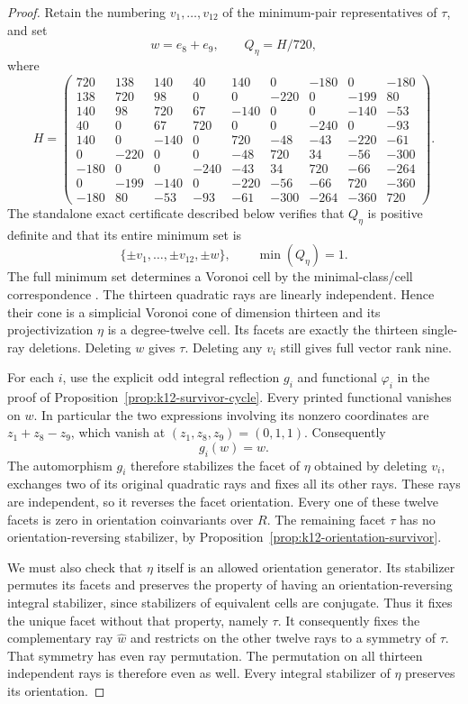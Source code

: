 \documentclass[11pt,a4paper]{article}
\theoremstyle{definition}
\begin{document}
\begin{proof}
Retain the numbering $v_1,\ldots,v_{12}$ of the minimum-pair
representatives of $\tau$, and set
\[
 w=e_8+e_9,\qquad Q_\eta=H/720,
\]
where
\begingroup
\setlength{\arraycolsep}{2.3pt}
\[
H=\begin{pmatrix}
720&138&140&40&140&0&-180&0&-180\\
138&720&98&0&0&-220&0&-199&80\\
140&98&720&67&-140&0&0&-140&-53\\
40&0&67&720&0&0&-240&0&-93\\
140&0&-140&0&720&-48&-43&-220&-61\\
0&-220&0&0&-48&720&34&-56&-300\\
-180&0&0&-240&-43&34&720&-66&-264\\
0&-199&-140&0&-220&-56&-66&720&-360\\
-180&80&-53&-93&-61&-300&-264&-360&720
\end{pmatrix}.
\]
\endgroup
The standalone exact certificate described below verifies that
$Q_\eta$ is positive definite and that its entire minimum set is
\[
              \{\pm v_1,\ldots,\pm v_{12},\pm w\},
              \qquad \min(Q_\eta)=1.                     \tag{CB.2}
\]
The full minimum set determines a Voronoi cell by the
minimal-class/cell correspondence
\cite[\S1.2.1, p.~4; \S2.1, p.~6]{DEKM2026}.
The thirteen quadratic rays are linearly independent. Hence their
cone is a simplicial Voronoi cone of dimension thirteen and its
projectivization $\eta$ is a degree-twelve cell. Its facets are
exactly the thirteen single-ray deletions. Deleting $w$ gives
$\tau$. Deleting any $v_i$ still gives full vector rank nine.

For each $i$, use the explicit odd integral reflection $g_i$ and
functional $\varphi_i$ in the proof of
Proposition~\ref{prop:k12-survivor-cycle}. Every printed functional
vanishes on $w$. In particular the two expressions involving its
nonzero coordinates are $z_1+z_8-z_9$, which vanish at
$(z_1,z_8,z_9)=(0,1,1)$. Consequently
\[
 g_i(w)=w .
\]
The automorphism $g_i$ therefore stabilizes the facet of $\eta$
obtained by deleting $v_i$, exchanges two of its original
quadratic rays and fixes all its other rays. These rays are
independent, so it reverses the facet orientation. Every one of
these twelve facets is zero in orientation coinvariants over $R$.
The remaining facet $\tau$ has no orientation-reversing stabilizer,
by Proposition~\ref{prop:k12-orientation-survivor}.

We must also check that $\eta$ itself is an allowed orientation
generator. Its stabilizer permutes its facets and preserves the
property of having an orientation-reversing integral stabilizer,
since stabilizers of equivalent cells are conjugate. Thus it
fixes the unique facet without that property, namely $\tau$.
It consequently fixes the complementary ray $\widehat w$ and
restricts on the other twelve rays to a symmetry of $\tau$.
That symmetry has even ray permutation. The permutation on all
thirteen independent rays is therefore even as well. Every
integral stabilizer of $\eta$ preserves its orientation.


\end{proof}
\end{document}
